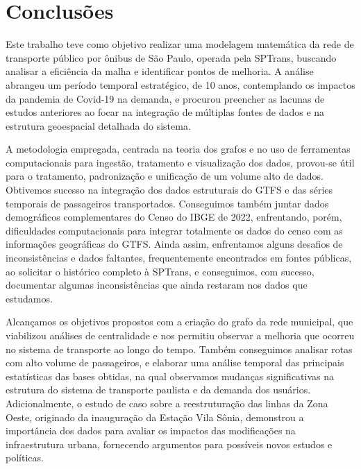 \chapter{Conclusões}

Este trabalho teve como objetivo realizar uma modelagem matemática da rede de transporte público por ônibus de São Paulo, operada pela SPTrans, buscando analisar a eficiência da malha e identificar pontos de melhoria. A análise abrangeu um período temporal estratégico, de 10 anos, contemplando os impactos da pandemia de Covid-19 na demanda, e procurou preencher as lacunas de estudos anteriores ao focar na integração de múltiplas fontes de dados e na estrutura geoespacial detalhada do sistema.

A metodologia empregada, centrada na teoria dos grafos e no uso de ferramentas computacionais para ingestão, tratamento e visualização dos dados, provou-se útil para o tratamento, padronização e unificação de um volume alto de dados. Obtivemos sucesso na integração dos dados estruturais do GTFS e das séries temporais de passageiros transportados. Conseguimos também juntar dados demográficos complementares do Censo do IBGE de 2022, enfrentando, porém, dificuldades computacionais para integrar totalmente os dados do censo com as informações geográficas do GTFS. Ainda assim, enfrentamos alguns desafios de inconsistências e dados faltantes, frequentemente encontrados em fontes públicas, ao solicitar o histórico completo à SPTrans, e conseguimos, com sucesso, documentar algumas inconsistências que ainda restaram nos dados que estudamos.

Alcançamos os objetivos propostos com a criação do grafo da rede municipal, que viabilizou análises de centralidade e nos permitiu observar a melhoria que ocorreu no sistema de transporte ao longo do tempo. Também conseguimos analisar rotas com alto volume de passageiros, e elaborar uma análise temporal das principais estatísticas das bases obtidas, na qual observamos mudanças significativas na estrutura do sistema de transporte paulista e da demanda dos usuários. Adicionalmente, o estudo de caso sobre a reestruturação das linhas da Zona Oeste, originado da inauguração da Estação Vila Sônia, demonstrou a importância dos dados para avaliar os impactos das modificações na infraestrutura urbana, fornecendo argumentos para possíveis novos estudos e políticas. 

